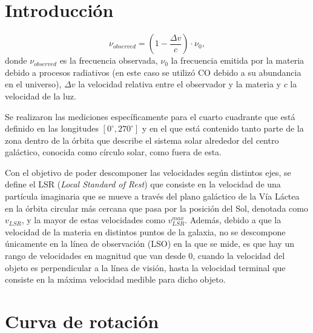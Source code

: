 \documentclass[letterpaper,oneside]{article}
\begin{document}
	
\templatePortrait

\templatePagecfg



\templateFinalcfg


\section{Introducción}

\[
\nu_{observed}=(1-\frac{\Delta v}{c})\cdot \nu_0,
\]
donde $\nu_{observed}$ es la frecuencia observada, $\nu_0$ la frecuencia emitida por la materia debido a procesos radiativos (en este caso se utilizó CO debido a su abundancia en el universo), $\Delta v$ la velocidad relativa entre el observador y la materia y $c$ la velocidad de la luz.

Se realizaron las mediciones específicamente para el cuarto cuadrante que está definido en las longitudes $[ 0^{\circ}, 270^{\circ}]$ y en el que está contenido tanto parte de la zona dentro de la órbita que describe el sistema solar alrededor del centro galáctico, conocida como círculo solar, como fuera de esta.

Con el objetivo de poder descomponer las velocidades según distintos ejes, se define el LSR (\textit{Local Standard of Rest}) que consiste en la velocidad de una partícula imaginaria que se mueve a través del plano galáctico de la Vía Láctea en la órbita circular más cercana que pasa por la posición del Sol, denotada como $v_{LSR}$, y la mayor de estas velocidades como $v_{LSR}^{max}$. Además, debido a que la velocidad de la materia en distintos puntos de la galaxia, no se descompone únicamente en la línea de observación (LSO) en la que se mide, es que hay un rango de velocidades en magnitud que van desde 0, cuando la velocidad del objeto es perpendicular a la línea de visión, hasta la velocidad terminal que consiste en la máxima velocidad medible para dicho objeto.

\section{Curva de rotación}
\end{document}
